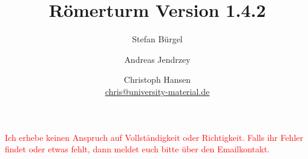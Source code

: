 \documentclass[a5paper,9pt,fleqn,twoside]{scrartcl}
\title{Römerturm Version 1.4.2}
\author{Stefan Bürgel \and Andreas Jendrzey \and Christoph Hansen \\ 
\href{mailto:chris@university-material.de}{chris@university-material.de}}
\date{}
\begin{document}
\thispagestyle{empty}
\cleardoublepage
\maketitle


\textcolor{red}{Ich erhebe keinen Anspruch auf Vollständigkeit oder Richtigkeit. Falls ihr Fehler findet oder etwas fehlt, dann meldet euch bitte über den Emailkontakt.}

\setcounter{page}{1}
\begin{multicols}{2}
	\tableofcontents
\end{multicols}
	\pagebreak
	
	
	
	
	
	
	
	
\pagestyle{empty}
\clearpage
\section*{ }
\clearpage
\section*{ }
\end{document}
